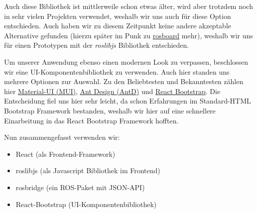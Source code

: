 \begin{flushleft}
    Auch diese Bibliothek ist mittlerweile schon etwas älter, wird aber trotzdem noch in sehr vielen Projekten verwendet, weshalb wir uns auch für diese Option entschieden. Auch haben wir zu diesem Zeitpunkt keine andere akzeptable Alternative gefunden (hierzu später im Punk zu \hyperlink{rosboard-target}{rosboard} mehr), weshalb wir uns für einen Prototypen mit der \textit{roslibjs} Bibliothek entschieden. 

    Um unserer Anwendung ebenso einen modernen Look zu verpassen, beschlossen wir eine UI-Komponentenbibliothek zu verwenden. Auch hier standen uns mehrere Optionen zur Auswahl. Zu den Beliebtesten und Bekanntesten zählen hier \href{https://mui.com}{Material-UI (MUI)}, \href{https://ant.design}{Ant Design (AntD)} und \href{https://react-bootstrap.github.io}{React Bootstrap}. Die Entscheidung fiel uns hier sehr leicht, da schon Erfahrungen im Standard-HTML Bootstrap Framework bestanden, weshalb wir hier auf eine schnellere Einarbeitung in das React Bootstrap Framework hofften.

    Nun zusammengefasst verwenden wir:
    \begin{itemize}
        \item React (als Frontend-Framework)
        \item roslibjs (als Javascript Bibliothek im Frontend)
        \item rosbridge (ein ROS-Paket mit JSON-API)
        \item React-Bootstrap (UI-Komponentenbibliothek)
    \end{itemize}
\end{flushleft}